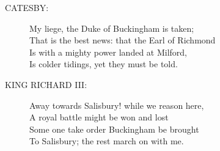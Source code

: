 \documentclass{article}
\begin{document}
\begin{description}
\item[CATESBY:] 
\hspace{1pt}My liege, the Duke of Buckingham is taken;\\
\hspace{1pt}That is the best news: that the Earl of Richmond\\
\hspace{1pt}Is with a mighty power landed at Milford,\\
\hspace{1pt}Is colder tidings, yet they must be told.\\
\end{description}
\begin{description}
\item[KING RICHARD III:] 
\hspace{1pt}Away towards Salisbury! while we reason here,\\
\hspace{1pt}A royal battle might be won and lost\\
\hspace{1pt}Some one take order Buckingham be brought\\
\hspace{1pt}To Salisbury; the rest march on with me.\\
\end{description}
\\
\end{document}

